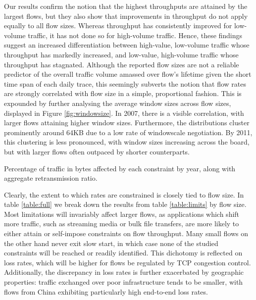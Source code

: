 Our results confirm the notion that the highest throughputs are attained by the largest flows, but they also show that improvements in throughput do not apply equally to all flow sizes. Whereas throughput has consistently improved for low-volume traffic, it has not done so for high-volume traffic. Hence, these findings suggest an increased differentiation between high-value, low-volume traffic whose throughput has markedly increased, and low-value, high-volume traffic whose throughput has stagnated.
Although the reported flow sizes are not a reliable predictor of the overall traffic volume amassed over flow's lifetime given the short time span of each daily trace, this seemingly subverts the notion that flow rates are strongly correlated with flow size in a simple, proportional fashion.  This is expounded by further analysing the average window sizes across flow sizes, displayed in Figure \ref{fig:windowsize}.
In 2007, there is a visible correlation, with larger flows attaining higher window sizes.
Furthermore, the distributions cluster prominently around 64KB due to a low rate of windowscale negotiation.
By 2011, this clustering is less pronounced, with window sizes increasing across the board, but with larger flows often outpaced by shorter counterparts.



\begin{table}\footnotesize
\centering
\caption{
Percentage of traffic in bytes affected by each constraint by year, along with aggregate retransmission ratio.}
\label{table:full}
\end{table}

Clearly, the extent to which rates are constrained is closely tied to flow size. 
In table \ref{table:full} we break down the results from table \ref{table:limits} by flow size. 
Most limitations will invariably affect larger flows, as applications which shift more traffic, such as streaming media or bulk file transfers, are more likely to either attain or self-impose constraints on flow throughput. 
Many small flows on the other hand never exit slow start, in which case none of the studied constraints will be reached or readily identified. 
This dichotomy is reflected on loss rates, which will be higher for flows be regulated by TCP congestion control.
Additionally, the discrepancy in loss rates is further exacerbated by geographic properties: traffic exchanged over poor infrastructure tends to be smaller, with flows from China exhibiting particularly high end-to-end loss rates. 

